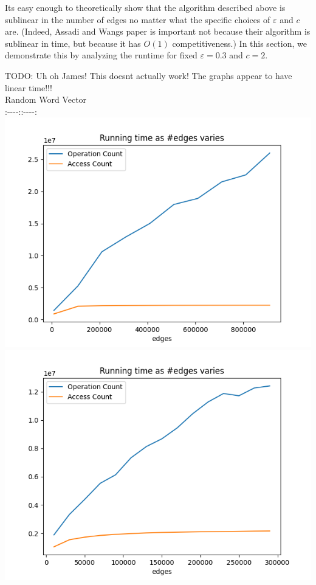 \documentclass[
]{article}
\begin{document}
It\textquotesingle s easy enough to theoretically show that the
algorithm described above is sublinear in the number of edges no matter
what the specific choices of {\(\varepsilon\)} and {\(c\)} are. (Indeed,
Assadi and Wang\textquotesingle s paper is important not because their
algorithm is sublinear in time, but because it has {\(O(1)\)}
competitiveness.) In this section, we demonstrate this by analyzing the
runtime for fixed {\(\varepsilon = 0.3\)} and {\(c = 2\)}.

TODO: Uh oh James! This doesn\textquotesingle t actually work! The
graphs appear to have linear time!!!\\
Random \textbar{} Word Vector\\
:-\/-\/-\/-:\textbar:-\/-\/-\/-:\\
\includegraphics{images/running_time_as_edges_varies.png}
\textbar{}
\includegraphics{images/running_time_as_edges_varies_word_vector.png}
\end{document}
